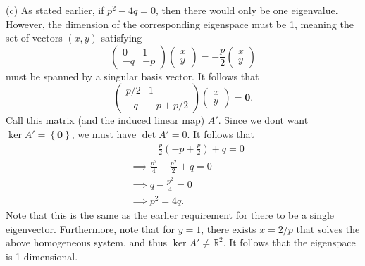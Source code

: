 \documentclass[11pt, letterpaper]{report}
\begin{document}
(c) As stated earlier, if $p^2-4q=0$, then there would only be one eigenvalue. However, the dimension of the corresponding eigenspace must be 1, meaning the set of vectors $(x,y)$ satisfying
\[
	\begin{pmatrix}
		0&1\\
		-q&-p
	\end{pmatrix} \begin{pmatrix}
		x\\
		y
	\end{pmatrix} =-\frac{p}{2}\begin{pmatrix}
		x\\
		y
	\end{pmatrix} 
\]
must be spanned by a singular basis vector. It follows that
\[
	\begin{pmatrix}
		p /2&1\\
		-q & -p + p /2
	\end{pmatrix} \begin{pmatrix}
		x\\
		y
	\end{pmatrix} =\mathbf{0}
.\]
Call this matrix (and the induced linear map) $A'$. Since we dont want $\ker A'=\left\{ \mathbf{0} \right\} $, we must have $\det A'=0$. It follows that
\begin{align*}
	&\qquad\;\;\;\frac{p}{2}\left( -p+\frac{p}{2} \right) +q=0\\
	&\implies \frac{p^2}{4}-\frac{p^2}{2}+q=0\\
	&\implies q-\frac{p^2}{4}=0\\
	&\implies p^2=4q
.\end{align*}
Note that this is the same as the earlier requirement for there to be a single eigenvector. Furthermore, note that for $y=1 $, there exists $x = 2 /p$ that solves the above homogeneous system, and thus $\ker A'\neq \mathbb{R}^2$. It follows that the eigenspace is 1 dimensional.
\end{document}
